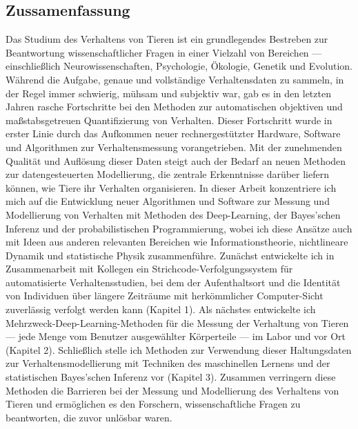 \documentclass[11pt,a4paper,oneside]{book}
\begin{document}
\begin{doublespace}
	\chapter*{Zussamenfassung}
  Das Studium des Verhaltens von Tieren ist ein grundlegendes Bestreben zur Beantwortung wissenschaftlicher Fragen in einer Vielzahl von Bereichen --- einschließlich Neurowissenschaften, Psychologie, Ökologie, Genetik und Evolution. Während die Aufgabe, genaue und vollständige Verhaltensdaten zu sammeln, in der Regel immer schwierig, mühsam und subjektiv war, gab es in den letzten Jahren rasche Fortschritte bei den Methoden zur automatischen objektiven und maßstabsgetreuen Quantifizierung von Verhalten. Dieser Fortschritt wurde in erster Linie durch das Aufkommen neuer rechnergestützter Hardware, Software und Algorithmen zur Verhaltensmessung vorangetrieben. Mit der zunehmenden Qualität und Auflösung dieser Daten steigt auch der Bedarf an neuen Methoden zur datengesteuerten Modellierung, die zentrale Erkenntnisse darüber liefern können, wie Tiere ihr Verhalten organisieren. In dieser Arbeit konzentriere ich mich auf die Entwicklung neuer Algorithmen und Software zur Messung und Modellierung von Verhalten mit Methoden des Deep-Learning, der Bayes'schen Inferenz und der probabilistischen Programmierung, wobei ich diese Ansätze auch mit Ideen aus anderen relevanten Bereichen wie Informationstheorie, nichtlineare Dynamik und statistische Physik zusammenführe. Zunächst entwickelte ich in Zusammenarbeit mit Kollegen ein Strichcode-Verfolgungssystem für automatisierte Verhaltensstudien, bei dem der Aufenthaltsort und die Identität von Individuen über längere Zeiträume mit herkömmlicher Computer-Sicht zuverlässig verfolgt werden kann (Kapitel 1). Als nächstes entwickelte ich Mehrzweck-Deep-Learning-Methoden für die Messung der Verhaltung von Tieren --- jede Menge vom Benutzer ausgewählter Körperteile --- im Labor und vor Ort (Kapitel 2). Schließlich stelle ich Methoden zur Verwendung dieser Haltungsdaten zur Verhaltensmodellierung mit Techniken des maschinellen Lernens und der statistischen Bayes'schen Inferenz vor (Kapitel 3). Zusammen verringern diese Methoden die Barrieren bei der Messung und Modellierung des Verhaltens von Tieren und ermöglichen es den Forschern, wissenschaftliche Fragen zu beantworten, die zuvor unlösbar waren.

	\newpage

\end{doublespace}
\end{document}
